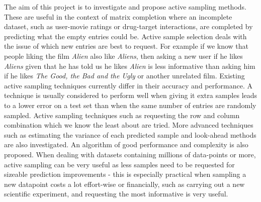 


\begin{abstractslong}    %

The aim of this project is to investigate and propose active sampling methods. These are useful in the context of matrix completion where an incomplete dataset, such as user-movie ratings or drug-target interactions, are completed by predicting what the empty entries could be. Active sample selection deals with the issue of which new entries are best to request. For example if we know that people liking the film \textit{Alien} also like \textit{Aliens}, then asking a new user if he likes \textit{Aliens} given that he has told us he likes  \textit{Alien} is less informative than asking him if he likes \textit{The Good, the Bad and the Ugly} or another unrelated film. 
Existing active sampling techniques currently differ in their accuracy and performance. A technique is usually considered to perform well when giving it extra samples leads to a lower error on a test set than when the same number of entries are randomly sampled. Active sampling techniques such as requesting the row and column combination which we know the least about are tried. More advanced techniques such as estimating the variance of each predicted sample and look-ahead methods are also investigated. An algorithm of good performance and complexity is also proposed. When dealing with  datasets containing millions of data-points or more, active sampling can be very useful as less samples need to be requested for sizeable prediction improvements - this is especially practical when sampling a new datapoint costs a lot effort-wise or financially, such as carrying out a new scientific experiment, and requesting the most informative is very useful.
 


\end{abstractslong}




